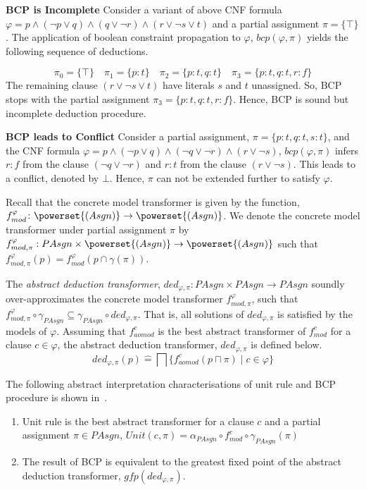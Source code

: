 \begin{example}
  \textbf{BCP is Incomplete} 
  Consider a variant of above CNF formula $\varphi = p \wedge (\neg p \vee q) \wedge (q \vee \neg
  r) \wedge (r \vee \neg s \vee t)$ and a partial assignment $\pi=\{\top\}$. The
  application of boolean constraint propagation to $\varphi$, $bcp(\varphi,\pi)$
  yields the following sequence of deductions.
\end{example}
  \[\pi_0=\{\top\} \quad \pi_1=\{p:t\} \quad \pi_2=\{p:t,q:t\} \quad
  \pi_3=\{p:t,q:t,r:f\} 
  \]
  The remaining clause $(r \vee \neg s \vee t)$ have literals $s$ and $t$
  unassigned. So, BCP stops with the partial assignment $\pi_3=\{p:t,q:t,r:f\}$.
  Hence, BCP is sound but incomplete deduction procedure. 

\begin{example}
  \textbf{BCP leads to Conflict} 
  Consider a partial assignment, $\pi=\{p:t,q:t,s:t\}$, and the CNF formula 
  $\varphi = p \wedge (\neg p \vee q) \wedge (\neg q \vee \neg r) \wedge (r \vee \neg s)$, 
  $bcp(\varphi,\pi)$ infers $r:f$ from the clause $(\neg q \vee \neg r)$ and
  $r:t$ from the clause $(r \vee \neg s)$.  This leads to a conflict, denoted by
  $\bot$. Hence, $\pi$ can not be extended further to satisfy $\varphi$. 
\end{example}
%
Recall that the concrete model transformer is given by the function, 
$f_{mod}^\varphi \colon \powerset{(Asgn)} \rightarrow \powerset{(Asgn)}$.  
We denote the concrete model transformer under partial assignment $\pi$ by
$f_{mod,\pi}^\varphi : PAsgn \times \powerset{(Asgn)} \rightarrow
\powerset{(Asgn)}$ such that $f_{mod,\pi}^\varphi(p) = f_{mod}^\varphi(p \cap \gamma(\pi))$.

The \emph{abstract deduction transformer}, $ded_{\varphi,\pi} \colon PAsgn
\times PAsgn \rightarrow PAsgn $ soundly over-approximates the concrete model transformer 
$f_{mod, \pi}^\varphi$, such that $f_{mod, \pi}^\varphi \circ \gamma_{PAsgn}
\subseteq \gamma_{PAsgn} \circ ded_{\varphi,\pi}$. That is, all solutions of
$ded_{\varphi,\pi}$ is satisfied by the models of $\varphi$. Assuming that
$f_{aomod}^c$ is the best abstract transformer of $f_{mod}^c$ for a clause $c
\in \varphi$, the abstract deduction transformer, $ded_{\varphi,\pi}$ is defined below.
\[
  ded_{\varphi,\pi}(p) \mathrel{\hat=} \bigsqcap \{f_{aomod}^c(p \sqcap \pi)
  \mid c \in \varphi\}
\]

The following abstract interpretation characterisations of unit rule and BCP 
procedure is shown in~\cite{leo-thesis}.
%
\begin{enumerate}
  \item Unit rule is the best abstract transformer for a clause $c$ and
    a partial assignment $\pi \in PAsgn$, $Unit(c, \pi) = \alpha_{PAsgn} \circ
    f_{mod}^c \circ \gamma_{PAsgn}(\pi)$
  \item The result of BCP is equivalent to the greatest fixed point of the 
    abstract deduction transformer, $gfp(ded_{\varphi,\pi})$.
\end{enumerate}
%
